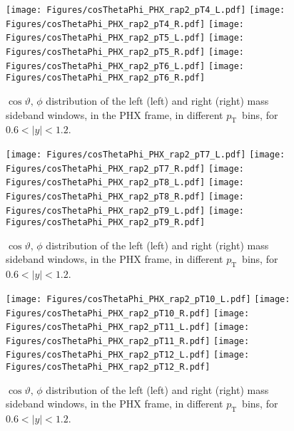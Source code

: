 \documentclass[12pt]{article}
\newcommand{\pt}{$p_{\mathrm{T}}$}
\begin{document}
\begin{figure}[htbp]
\centering
\texttt{[image: Figures/cosThetaPhi\_PHX\_rap2\_pT4\_L.pdf]}
\texttt{[image: Figures/cosThetaPhi\_PHX\_rap2\_pT4\_R.pdf]}
\texttt{[image: Figures/cosThetaPhi\_PHX\_rap2\_pT5\_L.pdf]}
\texttt{[image: Figures/cosThetaPhi\_PHX\_rap2\_pT5\_R.pdf]}
\texttt{[image: Figures/cosThetaPhi\_PHX\_rap2\_pT6\_L.pdf]}
\texttt{[image: Figures/cosThetaPhi\_PHX\_rap2\_pT6\_R.pdf]}
\caption{$\cos\vartheta,\,\phi$ distribution of the left (left) and
  right (right) mass sideband windows, in the PHX frame, in different
  \pt\ bins, for $0.6 < |y| < 1.2$.} 
\end{figure}
\clearpage

\begin{figure}[htbp]
\centering
\texttt{[image: Figures/cosThetaPhi\_PHX\_rap2\_pT7\_L.pdf]}
\texttt{[image: Figures/cosThetaPhi\_PHX\_rap2\_pT7\_R.pdf]}
\texttt{[image: Figures/cosThetaPhi\_PHX\_rap2\_pT8\_L.pdf]}
\texttt{[image: Figures/cosThetaPhi\_PHX\_rap2\_pT8\_R.pdf]}
\texttt{[image: Figures/cosThetaPhi\_PHX\_rap2\_pT9\_L.pdf]}
\texttt{[image: Figures/cosThetaPhi\_PHX\_rap2\_pT9\_R.pdf]}
\caption{$\cos\vartheta,\,\phi$ distribution of the left (left) and
  right (right) mass sideband windows, in the PHX frame, in different
  \pt\ bins, for $0.6 < |y| < 1.2$.}
\end{figure}
\clearpage

\begin{figure}[htbp]
\centering
\texttt{[image: Figures/cosThetaPhi\_PHX\_rap2\_pT10\_L.pdf]}
\texttt{[image: Figures/cosThetaPhi\_PHX\_rap2\_pT10\_R.pdf]}
\texttt{[image: Figures/cosThetaPhi\_PHX\_rap2\_pT11\_L.pdf]}
\texttt{[image: Figures/cosThetaPhi\_PHX\_rap2\_pT11\_R.pdf]}
\texttt{[image: Figures/cosThetaPhi\_PHX\_rap2\_pT12\_L.pdf]}
\texttt{[image: Figures/cosThetaPhi\_PHX\_rap2\_pT12\_R.pdf]}
\caption{$\cos\vartheta,\,\phi$ distribution of the left (left) and
  right (right) mass sideband windows, in the PHX frame, in different
  \pt\ bins, for $0.6 < |y| < 1.2$.}
\end{figure}
\clearpage
\end{document}
